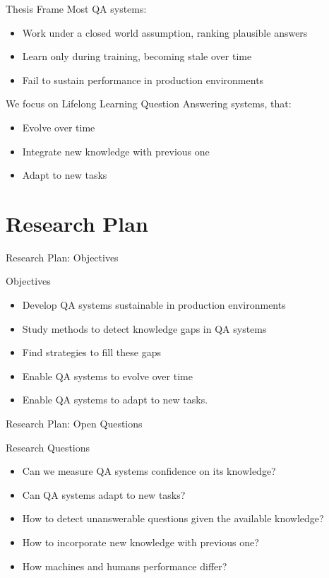 \documentclass{beamer}
\begin{document}
\begin{frame}{Thesis Frame}
  Most QA systems:
  \begin{itemize}
    \item Work under a closed world assumption, ranking plausible answers
    \item Learn only during training, becoming stale over time
    \item Fail to sustain performance in production environments
  \end{itemize}
  We focus on Lifelong Learning Question Answering systems, that:
  \begin{itemize}
    \item Evolve over time
    \item Integrate new knowledge with previous one
    \item Adapt to new tasks
  \end{itemize}
\end{frame}

\section{Research Plan}
\begin{frame}{Research Plan: Objectives}
  \begin{alertblock}{Objectives}
    \begin{itemize}
      \item Develop QA systems sustainable in production environments
      \item Study methods to detect knowledge gaps in QA systems
      \item Find strategies to fill these gaps
      \item Enable QA systems to evolve over time
      \item Enable QA systems to adapt to new tasks.
    \end{itemize}
  \end{alertblock}
\end{frame}


\begin{frame}{Research Plan: Open Questions}
  \begin{alertblock}{Research Questions}
    \begin{itemize}
      \item Can we measure QA systems confidence on its knowledge?
      \item Can QA systems adapt to new tasks?
      \item How to detect unanswerable questions given the available knowledge?
      \item How to incorporate new knowledge with previous one?
      \item How machines and humans performance differ?
    \end{itemize}
  \end{alertblock}
\end{frame}
\end{document}
